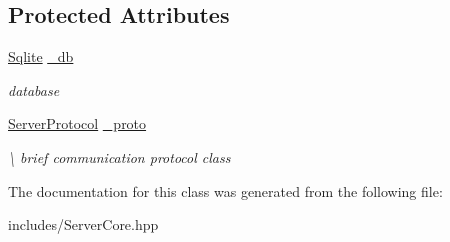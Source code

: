 \subsection*{Protected Attributes}
\begin{DoxyCompactItemize}
\item 
\mbox{\label{classspider_1_1_server_core_a14e8b53a65e4868cd7a126bffd2a8ebf}} 
\hyperlink{classspider_1_1_sqlite}{Sqlite} \hyperlink{classspider_1_1_server_core_a14e8b53a65e4868cd7a126bffd2a8ebf}{\+\_\+db}
\begin{DoxyCompactList}\small\item\em database \end{DoxyCompactList}\item 
\mbox{\label{classspider_1_1_server_core_a0724bac87db0ae8cad6fed5d1d70a1c5}} 
\hyperlink{classspider_1_1_server_protocol}{Server\+Protocol} \hyperlink{classspider_1_1_server_core_a0724bac87db0ae8cad6fed5d1d70a1c5}{\+\_\+proto}
\begin{DoxyCompactList}\small\item\em \textbackslash{} brief communication protocol class \end{DoxyCompactList}\end{DoxyCompactItemize}


The documentation for this class was generated from the following file\+:\begin{DoxyCompactItemize}
\item 
includes/Server\+Core.\+hpp\end{DoxyCompactItemize}
